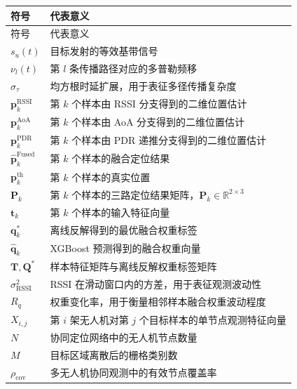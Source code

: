 \begin{nomenclature}
\renewcommand\arraystretch{1.15}

\begin{longtable}{p{3.2cm}p{10.8cm}}
  \toprule
  符号 & 代表意义 \\
  \midrule
  \endfirsthead

  \toprule
  符号 & 代表意义 \\
  \midrule
  \endhead

  \bottomrule
  \endfoot

  \bottomrule
  \endlastfoot

  \(s_u(t)\) & 目标发射的等效基带信号 \\
  \(\nu_l(t)\) & 第 \(l\) 条传播路径对应的多普勒频移 \\
  \(\sigma_{\tau}\) & 均方根时延扩展，用于表征多径传播复杂度 \\
  \(\mathbf{p}_{k}^{\mathrm{RSSI}}\) & 第 \(k\) 个样本由 RSSI 分支得到的二维位置估计 \\
  \(\mathbf{p}_{k}^{\mathrm{AoA}}\) & 第 \(k\) 个样本由 AoA 分支得到的二维位置估计 \\
  \(\mathbf{p}_{k}^{\mathrm{PDR}}\) & 第 \(k\) 个样本由 PDR 递推分支得到的二维位置估计 \\
  \(\hat{\mathbf{p}}_{k}^{\mathrm{Fused}}\) & 第 \(k\) 个样本的融合定位结果 \\
  \(\mathbf{p}_{k}^{\mathrm{th}}\) & 第 \(k\) 个样本的真实位置 \\
  \(\mathbf{P}_k\) & 第 \(k\) 个样本的三路定位结果矩阵，\(\mathbf{P}_k\in\mathbb{R}^{2\times3}\) \\
  \(\mathbf{t}_k\) & 第 \(k\) 个样本的输入特征向量 \\
  \(\mathbf{q}_k^\ast\) & 离线反解得到的最优融合权重标签 \\
  \(\hat{\mathbf{q}}_k\) & XGBoost 预测得到的融合权重向量 \\
  \(\mathbf{T},\mathbf{Q}^{\ast}\) & 样本特征矩阵与离线反解权重标签矩阵 \\
  \(\sigma_{\mathrm{RSSI}}^2\) & RSSI 在滑动窗口内的方差，用于表征观测波动性 \\
  \(R_q\) & 权重变化率，用于衡量相邻样本融合权重波动程度 \\
  \(X_{i,j}\) & 第 \(i\) 架无人机对第 \(j\) 个目标样本的单节点观测特征向量 \\
  \(N\) & 协同定位网络中的无人机节点数量 \\
  \(M\) & 目标区域离散后的栅格类别数 \\
  \(\rho_{\mathrm{cov}}\) & 多无人机协同观测中的有效节点覆盖率 \\

\end{longtable}
\end{nomenclature}
